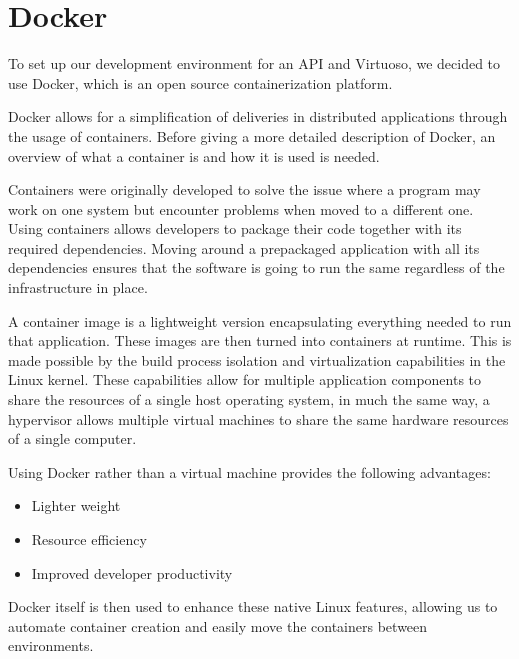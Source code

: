 \section{Docker}
To set up our development environment for an API and Virtuoso, we decided to use Docker, which is an open source containerization platform.

Docker allows for a simplification of deliveries in distributed applications through the usage of containers\cite{Container_Docker}. 
Before giving a more detailed description of Docker, an overview of what a container is and how it is used is needed. 


Containers were originally developed to solve the issue where a program may work on one system but encounter problems when moved to a different one. 
Using containers allows developers to package their code together with its required dependencies. 
Moving around a prepackaged application with all its dependencies ensures that the software is going to run the same regardless of the infrastructure in place\cite{Container_Docker}.


A container image is a lightweight version encapsulating everything needed to run that application. These images are then turned into containers at runtime. 
This is made possible by the build process isolation and virtualization capabilities in the Linux kernel. 
These capabilities allow for multiple application components to share the resources of a single host operating system, in much the same way, a hypervisor allows multiple virtual machines to share the same hardware resources of a single computer\cite{Container_Docker}.


Using Docker rather than a virtual machine provides the following advantages:

\begin{itemize}
    \item Lighter weight
    \item Resource efficiency
    \item Improved developer productivity
\end{itemize}

Docker itself is then used to enhance these native Linux features, allowing us to automate container creation and easily move the containers between environments\cite{Docker_IBM}.